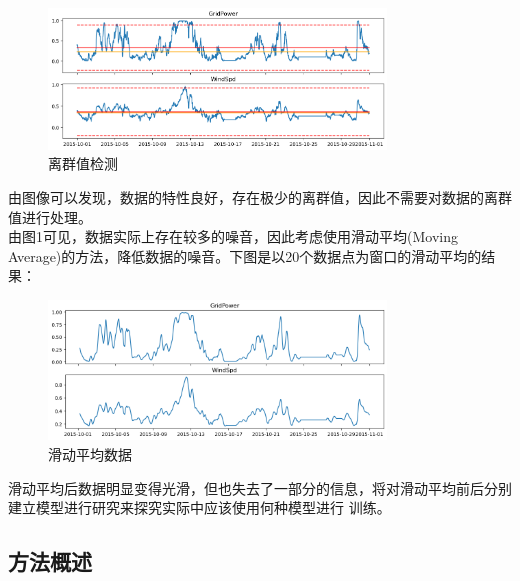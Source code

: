 \documentclass{ctexart}
\begin{document}
\begin{figure}[htbp]
    \centering
    \includegraphics[width=0.80\textwidth]{photos/outliers.png}
    \caption{离群值检测}
\end{figure}
由图像可以发现，数据的特性良好，存在极少的离群值，因此不需要对数据的离群值进行处理。\\
\indent 由图1可见，数据实际上存在较多的噪音，因此考虑使用滑动平均(Moving Average)的方法，降低数据的噪音。下图是以20个数据点为窗口的滑动平均的结果：\\
\begin{figure}[htbp]
    \centering
    \includegraphics[width = 0.8\textwidth]{photos/ma_time_series.png}
    \caption{滑动平均数据}
\end{figure}
滑动平均后数据明显变得光滑，但也失去了一部分的信息，将对滑动平均前后分别建立模型进行研究来探究实际中应该使用何种模型进行
训练。\\

\subsection{方法概述}
\end{document}
